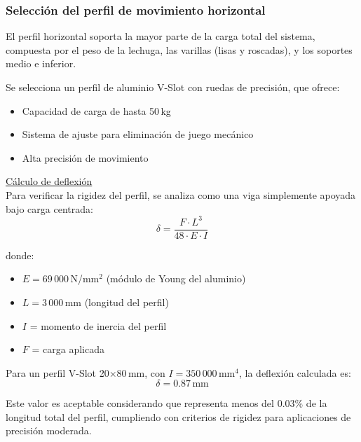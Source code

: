 \subsubsection{Selección del perfil de movimiento horizontal}
El perfil horizontal soporta la mayor parte de la carga total del sistema, compuesta por el peso de la lechuga, las varillas (lisas y roscadas), y los soportes medio e inferior.

Se selecciona un perfil de aluminio V-Slot con ruedas de precisión, que ofrece:
\begin{itemize}[label=$\bullet$]
    \item Capacidad de carga de hasta 50\,kg
    \item Sistema de ajuste para eliminación de juego mecánico
    \item Alta precisión de movimiento
\end{itemize}

\underline{Cálculo de deflexión} \\
Para verificar la rigidez del perfil, se analiza como una viga simplemente apoyada bajo carga centrada:
\begin{equation}
\delta = \frac{F \cdot L^3}{48 \cdot E \cdot I}
\label{eq:deflexion_perfil}
\end{equation}

donde:
\begin{itemize}[label=$\bullet$]
    \item $E = 69\,000$\,N/mm$^2$ (módulo de Young del aluminio)
    \item $L = 3\,000$\,mm (longitud del perfil)
    \item $I$ = momento de inercia del perfil
    \item $F$ = carga aplicada
\end{itemize}

Para un perfil V-Slot 20$\times$80\,mm, con $I = 350\,000$\,mm$^4$, la deflexión calculada es:
\[\delta = 0.87\,\text{mm}\]

Este valor es aceptable considerando que representa menos del 0.03\% de la longitud total del perfil, cumpliendo con criterios de rigidez para aplicaciones de precisión moderada.


